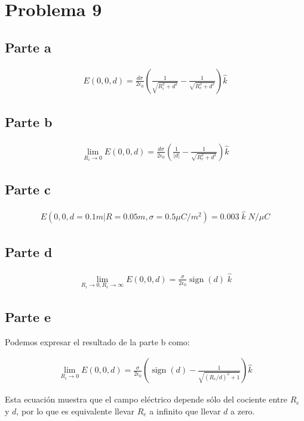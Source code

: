 \documentclass[12pt]{article}
\DeclareMathOperator{\sign}{sign}
\begin{document}
\section*{Problema 9}
\subsection*{Parte a}

\begin{align*}
    E(0,0,d)=\frac{d\sigma}{2\epsilon_0}\left(\frac{1}{\sqrt{R_i^2+d^2}}-\frac{1}{\sqrt{R_e^2+d^2}}\right)\hat{k}
\end{align*}

\subsection*{Parte b}

\begin{align*}
    \lim_{R_i\rightarrow 0}E(0,0,d)=\frac{d\sigma}{2\epsilon_0}\left(\frac{1}{|d|}-\frac{1}{\sqrt{R_e^2+d^2}}\right)\hat{k}
\end{align*}

\subsection*{Parte c}

\begin{align*}
    E(0,0,d=0.1m|R=0.05m,\sigma=0.5\mu C/m^2)=0.003\;\hat{k}\;N/\mu C
\end{align*}

\subsection*{Parte d}

\begin{align*}
    \lim_{R_i\rightarrow 0,R_e\rightarrow\infty}E(0,0,d)=\frac{\sigma}{2\epsilon_0}\sign(d)\;\hat{k}
\end{align*}

\subsection*{Parte e}

Podemos expresar el resultado de la parte b como:

\begin{align*}
    \lim_{R_i\rightarrow
    0}E(0,0,d)=\frac{\sigma}{2\epsilon_0}\left(\sign(d)-\frac{1}{\sqrt{(R_e/d)^2+1}}\right)\hat{k}
\end{align*}

\noindent Esta ecuación muestra que el campo eléctrico depende sólo del cociente
entre $R_e$ y $d$, por lo que es equivalente llevar $R_e$ a infinito que llevar
$d$ a zero.
\end{document}
